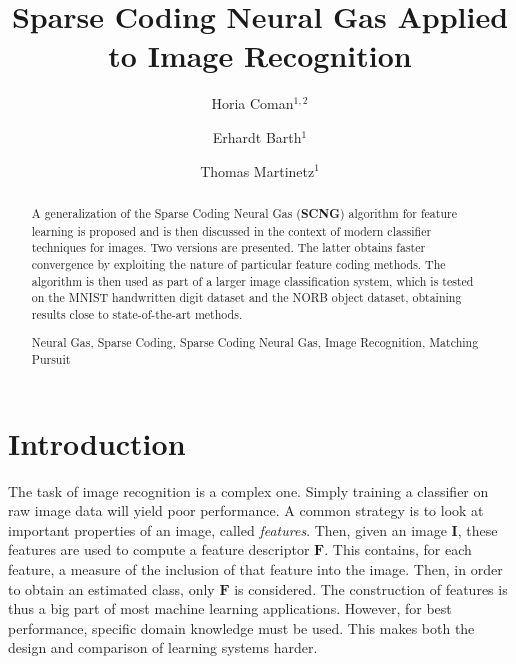 \documentclass[runningheads,a4paper]{llncs}
\newcommand{\keywords}[1]{\par\addvspace\baselineskip
\noindent\keywordname\enspace\ignorespaces#1}
\begin{document}
\mainmatter

\title{Sparse Coding Neural Gas Applied to Image Recognition}

\author{Horia Coman$^{1,2}$ \and Erhardt Barth$^{1}$ \and Thomas Martinetz$^{1}$}



\maketitle

\begin{abstract} A generalization of the Sparse Coding Neural Gas (\textbf{SCNG}) algorithm for feature learning is proposed and is then discussed in the context of modern classifier techniques for images. Two versions are presented. The latter obtains faster convergence by exploiting the nature of particular feature coding methods. The algorithm is then used as part of a larger image classification system, which is tested on the MNIST handwritten digit dataset and the NORB object dataset, obtaining results close to state-of-the-art methods.
\keywords{Neural Gas, Sparse Coding, Sparse Coding Neural Gas, Image Recognition, Matching Pursuit}
\end{abstract}

\section{Introduction}

The task of image recognition is a complex one. Simply training a classifier on raw image data will yield poor performance. A common strategy is to look at important properties of an image, called \emph{features}. Then, given an image $\textbf{I}$, these features are used to compute a feature descriptor $\textbf{F}$. This contains, for each feature, a measure of the inclusion of that feature into the image. Then, in order to obtain an estimated class, only $\textbf{F}$ is considered. The construction of features is thus a big part of most machine learning applications. However, for best performance, specific domain knowledge must be used. This makes both the design and comparison of learning systems harder.
\end{document}
